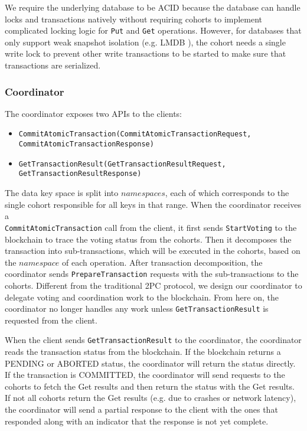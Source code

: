 \documentclass[11pt,conference]{IEEEtran}
\begin{document}
We require the underlying database to be ACID because the database can handle locks and transactions natively without requiring cohorts to implement complicated locking logic for \texttt{Put} and \texttt{Get} operations. However, for databases that only support weak snapshot isolation (e.g. LMDB \cite{}), the cohort needs a single write lock to prevent other write transactions to be started to make sure that transactions are serialized. 

\subsubsection{Coordinator} \label{coordinator}
The coordinator exposes two APIs to the clients:
\begin{itemize}
  \item \texttt{CommitAtomicTransaction(CommitAtomicTransactionRequest, CommitAtomicTransactionResponse)}
  \item \texttt{GetTransactionResult(GetTransactionResultRequest, GetTransactionResultResponse)}
\end{itemize}   

The data key space is split into $namespaces$, each of which corresponds to the single cohort responsible for all keys in that range.  When the coordinator receives a \texttt{\\CommitAtomicTransaction} call from the client, it first sends \texttt{StartVoting} to the blockchain to trace the voting status from the cohorts. Then it decomposes the transaction into sub-transactions, which will be executed in the cohorts, based on the $namespace$ of each operation. After transaction decomposition, the coordinator sends \texttt{PrepareTransaction} requests with the sub-transactions to the cohorts. Different from the traditional 2PC protocol, we design our coordinator to delegate voting and coordination work to the blockchain. From here on, the coordinator no longer handles any work unless \texttt{GetTransactionResult} is requested from the client.

When the client sends \texttt{GetTransactionResult} to the coordinator, the coordinator reads the transaction status from the blockchain. If the blockchain returns a PENDING or ABORTED status, the coordinator will return the status directly. If the transaction is COMMITTED, the coordinator will send requests to the cohorts to fetch the Get results and then return the status with the Get results. If not all cohorts return the Get results (e.g. due to crashes or network latency), the coordinator will send a partial response to the client with the ones that responded along with an indicator that the response is not yet complete.
\end{document}
